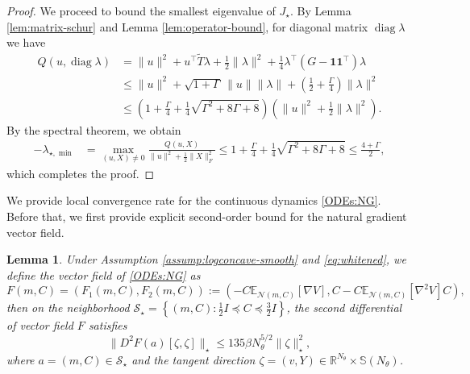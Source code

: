\documentclass[11pt]{article}
\theoremstyle{plain}
\newtheorem{lemma}[theorem]{Lemma}
\theoremstyle{definition}
\theoremstyle{remark}
\newcommand{\R}{\mathbb{R}}
\newcommand{\N}{\mathcal{N}}
\newcommand{\E}{\mathbb{E}}
\newcommand{\diag}{\operatorname{diag}}
\newcommand{\Sym}{\mathbb{S}}
\begin{document}
\begin{proof}
    We proceed to bound the smallest eigenvalue of $J_\star$. By Lemma \ref{lem:matrix-schur} and Lemma \ref{lem:operator-bound}, for diagonal matrix $\diag \lambda$ we have
    \begin{align*}
        Q(u, \diag \lambda) &= \|u\|^2 + u^\top \widetilde{T} \lambda + \frac{1}{2} \|\lambda\|^2 + \frac{1}{4} \lambda^\top (G - \mathbf{1} \mathbf{1}^\top) \lambda \\
        &\leq \|u\|^2 + \sqrt{1 + \Gamma}\, \|u\| \|\lambda\| + \left( \frac{1}{2} + \frac{\Gamma}{4} \right) \|\lambda\|^2 \\
        &\leq \left( 1 + \frac{\Gamma}{4} + \frac{1}{4} \sqrt{\Gamma^2 + 8\Gamma + 8} \right) \left( \|u\|^2 + \frac{1}{2} \|\lambda\|^2 \right).
    \end{align*}
    By the spectral theorem, we obtain
    \begin{align*}
        -\lambda_{\star, \min} &= \max_{(u, X) \neq 0} \frac{Q (u, X)}{\|u\|^2 + \frac{1}{2} \|X\|_F^2} \leq 1 + \frac{\Gamma}{4} + \frac{1}{4} \sqrt{\Gamma^2 + 8\Gamma + 8} \leq \frac{4 + \Gamma}{2},
    \end{align*}
    which completes the proof.
\end{proof}

We provide local convergence rate for the continuous dynamics \eqref{ODEs:NG}. Before that, we first provide explicit second-order bound for the natural gradient vector field.

\begin{lemma}\label{lem:2ord-bound-NG}
    Under Assumption \ref{assump:logconcave-smooth} and \eqref{eq:whitened}, we define the vector field of \eqref{ODEs:NG} as
    \begin{equation*}
        F (m, C) = (F_1 (m, C), F_2 (m, C)) := (-C \E_{\N(m, C)} [\nabla V], C - C \E_{\N (m, C)} [\nabla^2 V] C),
    \end{equation*}
    then on the neighborhood $\mathcal{S}_\star = \left\{ (m, C) : \frac{1}{2} I \preceq C \preceq \frac{3}{2} I \right\}$, the second differential of vector field $F$ satisfies
    \begin{equation*}
        \| D^2 F(a) [\zeta, \zeta] \|_\star \leq 135 \beta N_\theta^{5/2} \|\zeta\|_\star^2,
    \end{equation*}
    where $a = (m, C) \in \mathcal{S}_\star$ and the tangent direction $\zeta = (v, Y) \in \R^{N_\theta} \times \Sym(N_\theta)$.
\end{lemma}
\end{document}

